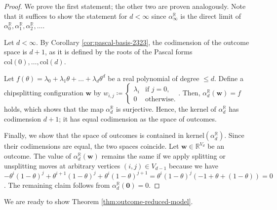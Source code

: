 \begin{proof}
    We prove the first statement; the other two are proven analogously. Note that it suffices to show the statement for \( d < \infty \) since \( \alpha_\infty^\mathbb{R} \) is the direct limit of \( \alpha^{\mathbb R}_0, \alpha^{\mathbb R}_1, \alpha^{\mathbb R}_2, \dots \).

    Let \( d < \infty \). By Corollary \ref{cor:pascal-basis-2323}, the codimension of the outcome space is \( d+1 \), as it is defined by the roots of the Pascal forms \( \mathrm{col}(0), \dots, \mathrm{col}(d) \). 

    Let \( f(\theta) = \lambda_0 + \lambda_1 \theta + \dots + \lambda_d \theta^d  \) be a real polynomial of degree \( \leq d \). Define a chipsplitting configuration \( \mathbf{w} \) by \(  w_{i,j} \coloneqq \begin{cases}
        \lambda_i & \text{if } j=0, \\
        0 & \text{otherwise}.
    \end{cases} \).
    Then, \( \alpha^\mathbb{R}_d(\mathbf w) = f \) holds, which shows that the map \( \alpha^{\mathbb R}_d \) is surjective. Hence, the kernel of \( \alpha^{\mathbb R}_d \) has codimension \( d+1 \); it has equal codimension as the space of outcomes. 

    Finally, we show that the space of outcomes is contained in \( \mathrm{kernel}(\alpha^{\mathbb R}_d) \). Since their codimensions are equal, the two spaces coincide. Let \( \mathbf{w} \in \mathbb{R}^{V_d} \) be an outcome. The value of \( \alpha^{\mathbb R}_d(\mathbf w) \) remains the same if we apply splitting or unsplitting moves at arbitrary vertices \( (i,j) \in V_{d-1} \) because we have \( -\theta^i(1-\theta)^j + \theta^{i+1}(1-\theta)^j + \theta^i(1-\theta)^{j+1} = \theta^i(1-\theta)^j (-1 + \theta + (1 - \theta)) = 0 \).
    The remaining claim follows from \( \alpha_d^{\mathbb{R}}(\mathbf 0) = 0 \).
\end{proof}

We are ready to show Theorem \ref{thm:outcome-reduced-model}.

